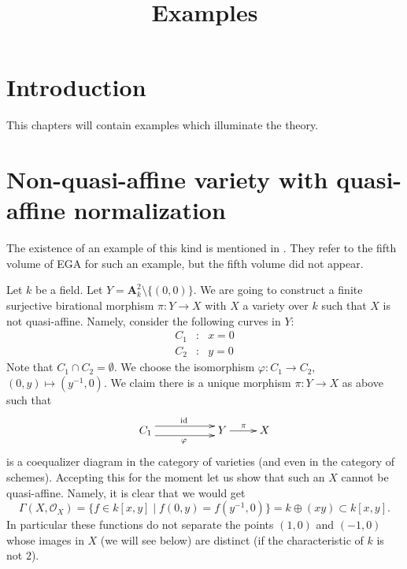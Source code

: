 

%


\title{Examples}


\maketitle

\label{section-phantom}

\tableofcontents

\section{Introduction}
\label{section-introduction}

\noindent
This chapters will contain examples which illuminate the theory.

\section{Non-quasi-affine variety with quasi-affine normalization}
\label{section-nonquasi-affine}

\noindent
The existence of an example of this kind is mentioned in
\cite[II Remark 6.6.13]{EGA}. They refer to the fifth volume of
EGA for such an example, but the fifth volume did not appear.

\medskip\noindent
Let $k$ be a field.
Let $Y = \mathbf{A}^2_k \setminus \{(0, 0)\}$.
We are going to construct a finite surjective birational morphism
$\pi : Y \longrightarrow X$
with $X$ a variety over $k$ such that $X$ is not quasi-affine.
Namely, consider the following curves in $Y$:
$$
\begin{matrix}
C_1 & : & x = 0 \\
C_2 & : & y = 0
\end{matrix}
$$
Note that $C_1 \cap C_2 = \emptyset$. We choose the isomorphism
$\varphi : C_1 \to C_2$, $(0, y) \mapsto (y^{-1}, 0)$.
We claim there is a unique morphism $\pi : Y \to X$ as above
such that
$$
\xymatrix{
C_1
\ar@<1ex>[rr]^{\text{id}} \ar@<-1ex>[rr]_{\varphi}
& &
Y \ar[r]^\pi & X
}
$$
is a coequalizer diagram in the category of varieties (and even in
the category of schemes). Accepting this for the moment let us
show that such an $X$ cannot be quasi-affine. Namely, it is clear
that we would get
$$
\Gamma(X, \mathcal{O}_X) =
\{ f \in k[x, y] \mid f(0, y) = f(y^{-1}, 0)\} =
k \oplus (xy) \subset k[x, y].
$$
In particular these functions do not separate the points $(1, 0)$
and $(-1, 0)$ whose images in $X$ (we will see below) are distinct
(if the characteristic of $k$ is not $2$).

